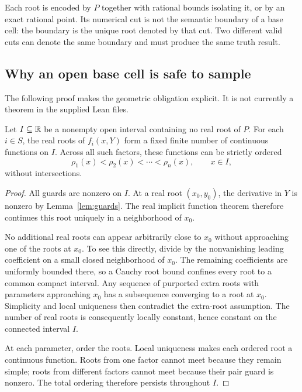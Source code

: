 Each root is encoded by $P$ together with rational bounds isolating it, or by an exact rational point. Its numerical cut is not the semantic boundary of a base cell: the boundary is the unique root denoted by that cut. Two different valid cuts can denote the same boundary and must produce the same truth result.

\subsection{Why an open base cell is safe to sample}
The following proof makes the geometric obligation explicit. It is not currently a theorem in the supplied Lean files.

\begin{lemma}\label{lem:persistence}
Let $I\subseteq\mathbb R$ be a nonempty open interval containing no real root of $P$. For each $i\in S$, the real roots of $f_i(x,Y)$ form a fixed finite number of continuous functions on $I$. Across all such factors, these functions can be strictly ordered
\[
 \rho_1(x)<\rho_2(x)<\cdots<\rho_n(x),\qquad x\in I,
\]
without intersections.
\end{lemma}
\begin{proof}
All guards are nonzero on $I$. At a real root $(x_0,y_0)$, the derivative in $Y$ is nonzero by Lemma~\ref{lem:guards}. The real implicit function theorem therefore continues this root uniquely in a neighborhood of $x_0$.

No additional real roots can appear arbitrarily close to $x_0$ without approaching one of the roots at $x_0$. To see this directly, divide by the nonvanishing leading coefficient on a small closed neighborhood of $x_0$. The remaining coefficients are uniformly bounded there, so a Cauchy root bound confines every root to a common compact interval. Any sequence of purported extra roots with parameters approaching $x_0$ has a subsequence converging to a root at $x_0$. Simplicity and local uniqueness then contradict the extra-root assumption. The number of real roots is consequently locally constant, hence constant on the connected interval $I$.

At each parameter, order the roots. Local uniqueness makes each ordered root a continuous function. Roots from one factor cannot meet because they remain simple; roots from different factors cannot meet because their pair guard is nonzero. The total ordering therefore persists throughout $I$.
\end{proof}


